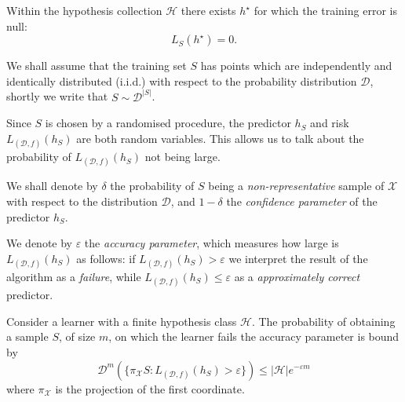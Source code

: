 \begin{definition}
    \label{def:realisability-assumption}
    Within the hypothesis collection \(\mathcal{H}\) there exists \(h^{\star}\) for
    which the training error is null:
    \[
        L_S(h^{\star}) = 0.
    \]
\end{definition}

\begin{definition}
    \label{def:iid-assumption}
    We shall assume that the training set \(S\) has points which are independently
    and identically distributed (i.i.d.) with respect to the probability distribution
    \(\mathcal{D}\), shortly we write that \(S \sim \mathcal{D}^{|S|}\).
\end{definition}

Since \(S\) is chosen by a randomised procedure, the predictor \(h_S\) and risk
\(L_{(\mathcal{D}, f)}(h_S)\) are both random variables. This allows us to talk
about the probability of \(L_{(\mathcal{D}, f)}(h_S)\) not being large.

\begin{definition}
    \label{def:confidence-parameter}
    We shall denote by \(\delta\) the probability of \(S\) being a
    \emph{non-representative} sample of \(\mathcal{X}\) with respect to the
    distribution \(\mathcal{D}\), and \(1 - \delta\) the \emph{confidence parameter}
    of the predictor \(h_S\).
\end{definition}

\begin{definition}
    \label{def:accuracy-parameter}
    We denote by \(\varepsilon\) the \emph{accuracy parameter}, which measures how
    large is \(L_{(\mathcal{D}, f)}(h_S)\) as follows: if
    \(L_{(\mathcal{D}, f)}(h_S) > \varepsilon\) we interpret the result of the
    algorithm as a \emph{failure}, while
    \(L_{(\mathcal{D}, f)}(h_S) \leq \varepsilon\) as a \emph{approximately correct}
    predictor.
\end{definition}

\begin{proposition}
    \label{prop:finite-hypothesis-class-failure-bound}
    Consider a learner with a finite hypothesis class \(\mathcal{H}\). The
    probability of obtaining a sample \(S\), of size \(m\), on which the learner
    fails the accuracy parameter is bound by
    \[
        \mathcal{D}^m(\{\pi_{\mathcal{X}} S \colon L_{(\mathcal{D}, f)}(h_S) > \varepsilon\})
        \leq |\mathcal{H}| e^{-\varepsilon m}
    \]
    where \(\pi_{\mathcal{X}}\) is the projection of the first coordinate.
\end{proposition}

